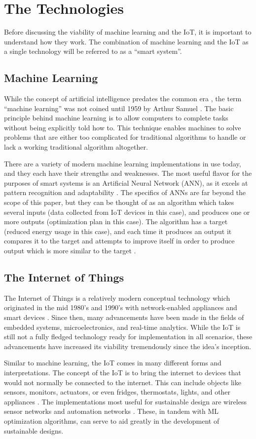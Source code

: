 \documentclass[letterpaper]{article}
\begin{document}
\section{The Technologies} \label{info}
Before discussing the viability of machine learning and the IoT, it is important to understand how they work. The combination of machine learning and the IoT as a single technology will be referred to as a ``smart system''.

\subsection{Machine Learning} \label{MLinfo}
While the concept of artificial intelligence predates the common era \cite{mccorduck04}, the term ``machine learning'' was not coined until 1959 by Arthur Samuel \cite{samuel59}. The basic principle behind machine learning is to allow computers to complete tasks without being explicitly told how to. This technique enables machines to solve problems that are either too complicated for traditional algorithms to handle or lack a working traditional algorithm altogether.\par
There are a variety of modern machine learning implementations in use today, and they each have their strengths and weaknesses. The most useful flavor for the purposes of smart systems is an Artificial Neural Network (ANN), as it excels at pattern recognition and adaptability \cite{bishop06}. The specifics of ANNs are far beyond the scope of this paper, but they can be thought of as an algorithm which takes several inputs (data collected from IoT devices in this case), and produces one or more outputs (optimization plan in this case). The algorithm has a target (reduced energy usage in this case), and each time it produces an output it compares it to the target and attempts to improve itself in order to produce output which is more similar to the target \cite{bonaccorso17}.

\subsection{The Internet of Things} \label{IoTinfo}
The Internet of Things is a relatively modern conceptual technology which originated in the mid 1980's and 1990's with network-enabled appliances and smart devices \cite{weiser91}. Since then, many advancements have been made in the fields of embedded systems, microelectronics, and real-time analytics. While the IoT is still not a fully fledged technology ready for implementation in all scenarios, these advancements have increased its viability tremendously since the idea's inception.\par
Similar to machine learning, the IoT comes in many different forms and interpretations. The concept of the IoT is to bring the internet to devices that would not normally be connected to the internet. This can include objects like sensors, monitors, actuators, or even fridges, thermostats, lights, and other appliances \cite{wortmann15}. The implementations most useful for sustainable design are wireless sensor networks and automation networks \cite{atzori10}. These, in tandem with ML optimization algorithms, can serve to aid greatly in the development of sustainable designs.
\end{document}

